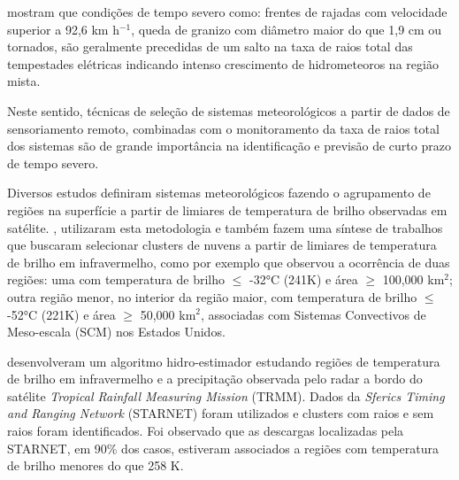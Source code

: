  mostram que condições de tempo severo como: frentes de rajadas com velocidade superior a 92,6 km h$^{-1}$, queda de granizo com diâmetro maior do que 1,9 cm ou tornados, são geralmente precedidas de um salto na taxa de raios total das tempestades elétricas indicando intenso crescimento de hidrometeoros na região mista.      

Neste sentido, técnicas de seleção de sistemas meteorológicos a partir de dados de sensoriamento remoto, combinadas com o monitoramento da taxa de raios total dos sistemas são de grande importância na identificação e previsão de curto prazo de tempo severo. 

Diversos estudos definiram sistemas meteorológicos fazendo o agrupamento de regiões na superfície a partir de limiares de temperatura de brilho observadas em satélite. , utilizaram esta metodologia e também fazem uma síntese de trabalhos que buscaram selecionar clusters de nuvens a partir de limiares de temperatura de brilho em infravermelho, como por exemplo  que observou a ocorrência de duas regiões: uma com temperatura de brilho $\leqslant$ -32°C (241K) e área $\geqslant$ 100,000 km$^2$;  outra região menor, no interior da região maior, com temperatura de brilho $\leqslant$ -52°C (221K) e área $\geqslant$ 50,000 km$^2$, associadas com Sistemas Convectivos de Meso-escala (SCM) nos Estados Unidos.

 desenvolveram um algoritmo hidro-estimador estudando regiões de temperatura de brilho em infravermelho e a precipitação observada pelo radar a bordo do satélite \textit{Tropical Rainfall Measuring Mission} (TRMM). Dados da \textit{Sferics Timing and Ranging Network} (STARNET) foram utilizados e clusters com raios e sem raios foram identificados. Foi observado que as descargas localizadas pela STARNET, em 90\% dos casos, estiveram associados a regiões com temperatura de brilho menores do que 258 K.




